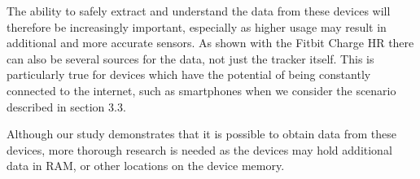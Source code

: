 \documentclass[a4paper,11pt,dvips]{article}
\begin{document}
The ability to safely extract and understand the data from these devices will therefore be increasingly important, especially as higher usage may result in additional and more accurate sensors. As shown with the Fitbit Charge HR there can also be several sources for the data, not just the tracker itself. This is particularly true for devices which have the potential of being constantly connected to the internet, such as smartphones when we consider the scenario described in section 3.3.  

Although our study demonstrates that it is possible to obtain data from these devices, more thorough research is needed as the devices may hold additional data in RAM, or other locations on the device memory. 



\end{document}
